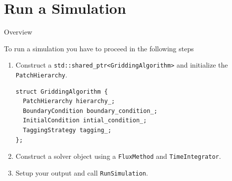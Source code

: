 \documentclass[ucs,9pt]{beamer}
\begin{document}
\section{Run a Simulation}
\begin{frame}{Overview}
\tableofcontents[currentsection]
\end{frame}

\begin{frame}[fragile]
To run a simulation you have to proceed in the following steps
\vspace{0.4cm}
\begin{enumerate}
	\item Construct a \texttt{std::shared\_ptr<GriddingAlgorithm>} and initialize the \texttt{PatchHierarchy}.
\begin{lstlisting}
struct GriddingAlgorithm {
  PatchHierarchy hierarchy_;
  BoundaryCondition boundary_condition_;
  InitialCondition intial_condition_;
  TaggingStrategy tagging_;
};
\end{lstlisting}
	\item Construct a solver object using a \texttt{FluxMethod} and \texttt{TimeIntegrator}.
	\item Setup your output and call \texttt{RunSimulation}.
\end{enumerate}
\end{frame}
\end{document}

